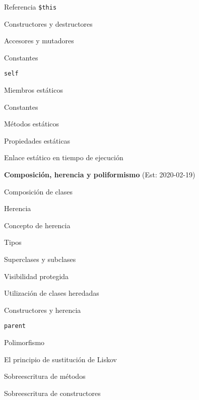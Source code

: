 \begin{longenum}
\begin{longenum}
\begin{longenum}
            \item Referencia \texttt{\$this}
            \item Constructores y destructores
            \item Accesores y mutadores
        \end{longenum}
        \item Constantes
        \begin{longenum}
            \item \texttt{self}
        \end{longenum}
        \item Miembros estáticos
        \begin{longenum}
            \item Constantes
            \item Métodos estáticos
            \item Propiedades estáticas
            \item Enlace estático en tiempo de ejecución
        \end{longenum}
    \end{longenum}
    \item \textbf{Composición, herencia y poliformismo}  (Est: 2020-02-19)
    \begin{longenum}
        \item Composición de clases
        \item Herencia
        \begin{longenum}
            \item Concepto de herencia
            \item Tipos
            \item Superclases y subclases
            \item Visibilidad protegida
            \item Utilización de clases heredadas
            \item Constructores y herencia
            \item \texttt{parent}
        \end{longenum}
        \item Polimorfismo
        \begin{longenum}
            \item El principio de sustitución de Liskov
            \item Sobreescritura de métodos
            \item Sobreescritura de constructores
        \end{longenum}

\end{longenum}
\end{longenum}
